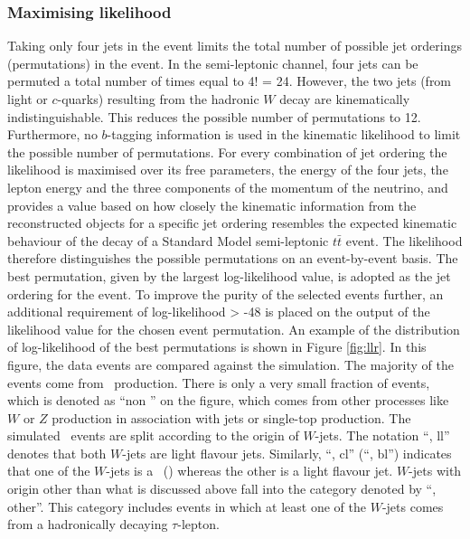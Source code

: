 \documentclass[letterpaper,12pt]{article}
\begin{document}
\subsubsection{Maximising likelihood}
\label{maximise likelihood}
Taking only four jets in the event limits the total number of possible 
jet orderings (permutations) in the event. In the semi-leptonic channel, 
four jets can be permuted a total number of times equal to 4! = 24. 
However, the two jets (from light or $c$-quarks) resulting from the 
hadronic $W$ decay are kinematically indistinguishable. This reduces 
the possible number of permutations to 12. Furthermore, no $b$-tagging 
information is used in the kinematic likelihood to limit the possible number of permutations.
For every combination of jet ordering the likelihood is maximised over 
its free parameters, the energy of the four jets, the lepton energy and 
the three components of the momentum of the neutrino, and provides a 
value based on how closely the kinematic information from the reconstructed 
objects for a specific jet ordering resembles the expected kinematic behaviour 
of the decay of a Standard Model semi-leptonic $t\bar{t}$ event. The likelihood 
therefore distinguishes the possible permutations on an event-by-event basis. 
The best permutation, given by the largest log-likelihood value, is adopted 
as the jet ordering for the event\cite{cjet}. To improve the purity of the 
selected events further, an additional requirement of log-likelihood > -48 is 
placed on the output of the likelihood value for the chosen event permutation. 
An example of the distribution of log-likelihood of the best permutations 
is shown in Figure \ref{fig:llr}. 
In this figure, the data events are compared against the simulation.
The majority of the events come from \ttbar\ production. There is only
a very small fraction of events, which is denoted as ``non \ttbar''
on the figure, which comes from other processes like $W$ or $Z$ production
in association with jets or single-top production. The simulated \ttbar\
events are split according to the origin of $W$-jets. The notation
``\ttbar, ll'' denotes that both $W$-jets are light flavour jets.
Similarly, ``\ttbar, cl'' (``\ttbar, bl'') 
indicates that one of the $W$-jets is a \cjet\ (\bjet)
whereas the other is a light flavour jet. $W$-jets with origin
other than what is discussed above fall into the 
category denoted by ``\ttbar, other''. This category includes
events in which at least one of the $W$-jets comes from a
hadronically decaying $\tau$-lepton. 
\end{document}
